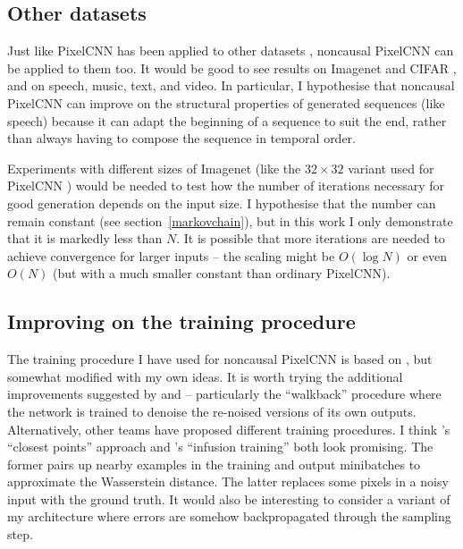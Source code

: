 \documentclass[11pt, a4paper, openany]{book}
\newcommand{\nquote}[1]{``{#1}''}
\begin{document}
\subsection{Other datasets}

Just like PixelCNN has been applied to other datasets \citep{pixelcnn2,wavenet,bytenet,videopixel}, noncausal PixelCNN can be applied to them too. It would be good to see results on Imagenet \citep{imagenet} and CIFAR \citep{cifar}, and on speech, music, text, and video. In particular, I hypothesise that noncausal PixelCNN can improve on the structural properties of generated sequences (like speech) because it can adapt the beginning of a sequence to suit the end, rather than always having to compose the sequence in temporal order.

Experiments with different sizes of Imagenet (like the $32\times 32$ variant used for PixelCNN \citep{pixelcnn2}) would be needed to test how the number of iterations necessary for good generation depends on the input size. I hypothesise that the number can remain constant (see section~\ref{markovchain}), but in this work I only demonstrate that it is markedly less than $N$. It is possible that more iterations are needed to achieve convergence for larger inputs -- the scaling might be $O(\log{N})$ or even $O(N)$ (but with a much smaller constant than ordinary PixelCNN).

\subsection{Improving on the training procedure}

The training procedure I have used for noncausal PixelCNN is based on \citet{gsnnade}, but somewhat modified with my own ideas. It is worth trying the additional improvements suggested by \citet{denoisinggenerative} and \citet{transitionstochastic} -- particularly the \nquote{walkback} procedure where the network is trained to denoise the re-noised versions of its own outputs. Alternatively, other teams have proposed different training procedures. I think \citet{iterativeclosest}'s \nquote{closest points} approach and \citet{infusion}'s \nquote{infusion training} both look promising. The former pairs up nearby examples in the training and output minibatches to approximate the Wasserstein distance. The latter replaces some pixels in a noisy input with the ground truth. It would also be interesting to consider a variant of my architecture where errors are somehow backpropagated through the sampling step.
\end{document}
